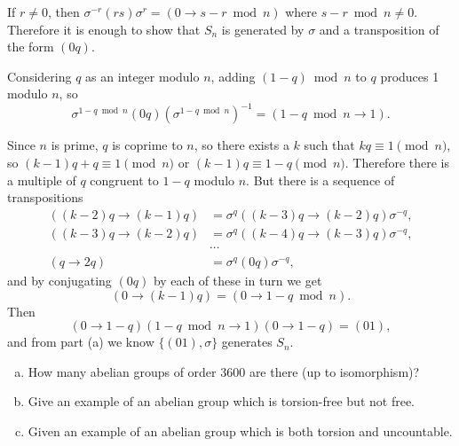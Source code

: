 \documentclass{article}
\newcounter{Problem}
\newenvironment{Problem}{\begin{Exercise}[name={Problem},
                                          counter={Problem}]}
                        {\end{Exercise}}
\begin{document}
\begin{Answer}
\begin{enumerate}
{    If $r \neq 0$, then
    $\sigma^{-r}(rs)\sigma^{r} = (0 \to s - r \bmod n)$ where
    $s - r \bmod n \neq 0$. Therefore it is enough to show that
    $S_n$ is generated by $\sigma$ and a transposition
    of the form $(0q)$.

    Considering $q$ as an integer modulo $n$, adding $(1 - q) \bmod n$
    to $q$ produces 1 modulo $n$, so
    $$
    \sigma^{1 - q \bmod n} (0q) (\sigma^{1 - q \bmod n})^{-1}
      = (1 - q \bmod n \to 1).
    $$

    Since $n$ is prime, $q$ is coprime to $n$, so there exists a $k$
    such that $kq \equiv 1 \pmod{n}$, so  $(k - 1)q + q \equiv 1 \pmod{n}$ or
    $(k - 1)q \equiv 1 - q \pmod{n}$. Therefore there is a multiple of
    $q$ congruent to $1 - q$ modulo $n$. But there is a sequence of
    transpositions
    \begin{align*}
    ((k-2)q \to (k-1)q)
      &= \sigma^{q}((k-3)q \to (k-2)q)\sigma^{-q}, \\
    ((k-3)q \to (k-2)q)
      &= \sigma^{q}((k-4)q \to (k-3)q)\sigma^{-q}, \\
      &\cdots \\
    (q \to 2q)
      &= \sigma^{q}(0 q)\sigma^{-q},
    \end{align*}
    and by conjugating $(0q)$ by each of these in turn we get
    $$
    (0 \to (k - 1)q) = (0 \to 1 - q \bmod n).
    $$
    Then
    $$
    (0 \to 1 - q) (1 - q \bmod n \to 1) (0 \to 1 - q)
      = (01),
    $$
    and from part (a) we know $\{ (01), \sigma \}$ generates $S_n$.
  }
\end{enumerate}
\end{Answer}

\pagebreak

\begin{Problem}
\begin{enumerate}[(a)]
  \item{
    How many abelian groups of order 3600 are there (up to isomorphism)?
  }
  \item{
    Give an example of an abelian group which is torsion-free but not free.
  }
  \item{
    Given an example of an abelian group which is both torsion and uncountable.
  }
\end{enumerate}
\end{Problem}
\end{document}
